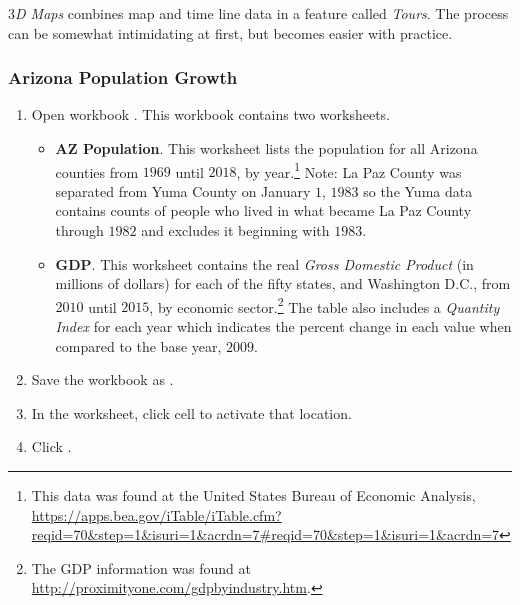 \textit{$ 3 $D Maps} combines map and time line data in a feature called \textit{Tours}. The process can be somewhat intimidating at first, but becomes easier with practice.

\subsubsection{Arizona Population Growth}

\begin{enumerate}
	\item Open workbook . This workbook contains two worksheets.
	
	\begin{itemize}
		\item \textbf{AZ Population}. This worksheet lists the population for all Arizona counties from $ 1969 $ until $ 2018 $, by year.\footnote{This data was found at the United States Bureau of Economic Analysis, \url{https://apps.bea.gov/iTable/iTable.cfm?reqid=70&step=1&isuri=1&acrdn=7\#reqid=70&step=1&isuri=1&acrdn=7}} Note: La Paz County was separated from Yuma County on January $ 1 $, $ 1983 $ so the Yuma data contains counts of people who lived in what became La Paz County through $ 1982 $ and excludes it beginning with $ 1983 $.
		\item \textbf{GDP}. This worksheet contains the real \textit{Gross Domestic Product} (in millions of dollars) for each of the fifty states, and Washington D.C., from $ 2010 $ until $ 2015 $, by economic sector.\footnote{The GDP information was found at \url{http://proximityone.com/gdpbyindustry.htm}.} The table also includes a \textit{Quantity Index} for each year which indicates the percent change in each value when compared to the base year, $ 2009 $.
	\end{itemize}
	
	\item Save the workbook as .
	\item In the  worksheet, click cell  to activate that location.
	\item Click .
\end{enumerate}

